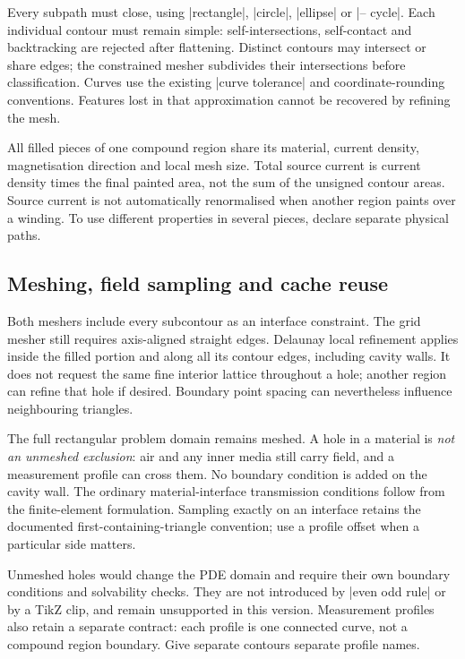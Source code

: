 Every subpath must close, using |rectangle|, |circle|, |ellipse| or
|-- cycle|. Each individual contour must remain simple: self-intersections,
self-contact and backtracking are rejected after flattening. Distinct
contours may intersect or share edges; the constrained mesher subdivides
their intersections before classification. Curves use the existing
|curve tolerance| and coordinate-rounding conventions. Features lost in
that approximation cannot be recovered by refining the mesh.

All filled pieces of one compound region share its material, current
density, magnetisation direction and local mesh size. Total source current
is current density times the final painted area, not the sum of the
unsigned contour areas. Source current is not automatically renormalised
when another region paints over a winding. To use different properties
in several pieces, declare separate physical paths.

\subsection{Meshing, field sampling and cache reuse}
Both meshers include every subcontour as an interface constraint. The
grid mesher still requires axis-aligned straight edges. Delaunay local
refinement applies inside the filled portion and along all its contour
edges, including cavity walls. It does not request the same fine interior
lattice throughout a hole; another region can refine that hole if desired.
Boundary point spacing can nevertheless influence neighbouring triangles.

The full rectangular problem domain remains meshed. A hole in a material
is \emph{not an unmeshed exclusion}: air and any inner media still carry
field, and a measurement profile can cross them. No boundary condition
is added on the cavity wall. The ordinary material-interface transmission
conditions follow from the finite-element formulation. Sampling exactly
on an interface retains the documented first-containing-triangle
convention; use a profile offset when a particular side matters.

Unmeshed holes would change the PDE domain and require their own boundary
conditions and solvability checks. They are not introduced by |even odd rule|
or by a TikZ clip, and remain unsupported in this version. Measurement
profiles also retain a separate contract: each profile is one connected
curve, not a compound region boundary. Give separate contours separate
profile names.

